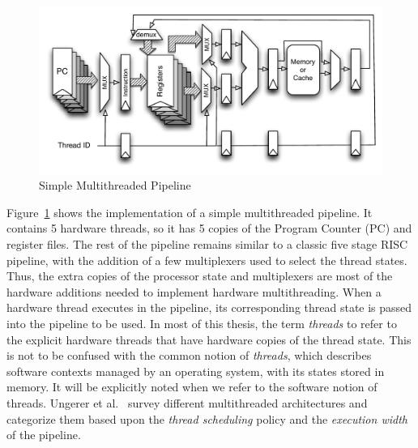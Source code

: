 \begin{figure}[h]
\begin{center}
\includegraphics[scale=.8]{figs/multithreaded_pipeline_block}
\end{center}
\vspace{-10pt}
\caption{Simple Multithreaded Pipeline}
\label{fig:multi-thread pipeline simplified}
\end{figure}
Figure~\ref{fig:multi-thread pipeline simplified} shows the implementation of a simple multithreaded pipeline.
It contains 5 hardware threads, so it has 5 copies of the Program Counter (PC) and register files.
The rest of the pipeline remains similar to a classic five stage RISC pipeline, with the addition of a few multiplexers used to select the thread states.
Thus, the extra copies of the processor state and multiplexers are most of the hardware additions needed to implement hardware multithreading.
When a hardware thread executes in the pipeline, its corresponding thread state is passed into the pipeline to be used.
In most of this thesis, the term \emph{threads} to refer to the explicit hardware threads that have hardware copies of the thread state.
This is not to be confused with the common notion of \emph{threads}, which describes software contexts managed by an operating system, with its states stored in memory.
It will be explicitly noted when we refer to the software notion of threads. 
Ungerer et al.~\cite{Ungerer:2003:survey_multithreading} survey different multithreaded architectures and categorize them based upon the \emph{thread scheduling} policy and the \emph{execution width} of the pipeline.

